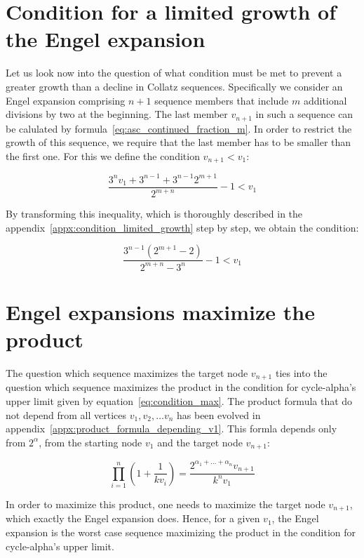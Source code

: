 \documentclass[12pt]{amsart}
\theoremstyle{definition}
\begin{document}
\section{Condition for a limited growth of the Engel expansion}
\label{sec:condition_limited_growth}
Let us look now into the question of what condition must be met to prevent a greater growth than a decline in Collatz sequences. Specifically we consider an Engel expansion comprising $n+1$ sequence members that include $m$ additional divisions by two at the beginning. The last member $v_{n+1}$ in such a sequence can be calulated by formula~\ref{eq:asc_continued_fraction_m}. In order to restrict the growth of this sequence, we require that the last member has to be smaller than the first one. For this we define the condition $v_{n+1}<v_1$:

\[
\frac{3^nv_1+3^{n-1}+3^{n-1}2^{m+1}}{2^{m+n}}-1<v_1
\]

By transforming this inequality, which is thoroughly described in the appendix~\ref{appx:condition_limited_growth} step by step, we obtain the condition:

\begin{equation}
\label{eq:condition_limited_growth}
\frac{3^{n-1}\left(2^{m+1}-2\right)}{2^{m+n}-3^n}-1<v_1
\end{equation}

\section{Engel expansions maximize the product}
The question which sequence maximizes the target node $v_{n+1}$ ties into the question which sequence maximizes the product in the condition for cycle-alpha's upper limit given by equation~\ref{eq:condition_max}. The product formula that do not depend from all vertices $v_1,v_2,\ldots v_n$ has been evolved in appendix~\ref{appx:product_formula_depending_v1}. This formla depends only from $2^\alpha$, from the starting node $v_1$ and the target node $v_{n+1}$:

\[
\prod_{i=1}^{n}\left(1+\frac{1}{kv_i}\right)=\frac{2^{\alpha_1+\ldots+\alpha_n}v_{n+1}}{k^nv_1}
\]

In order to maximize this product, one needs to maximize the target node $v_{n+1}$, which exactly the Engel expansion does. Hence, for a given $v_1$, the Engel expansion is the worst case sequence maximizing the product in the condition for cycle-alpha's upper limit.



\end{document}
